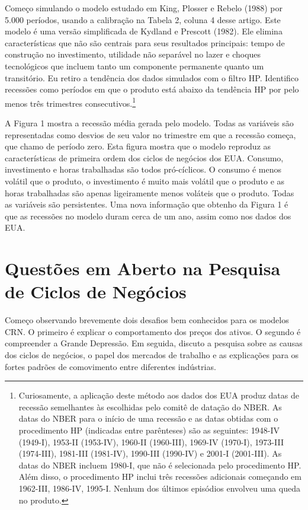 \documentclass[12pt]{article}
\begin{document}
Começo simulando o modelo estudado em King, Plosser e Rebelo (1988) por 5.000 períodos, usando a calibração na Tabela 2, coluna 4 desse artigo. Este modelo é uma versão simplificada de Kydland e Prescott (1982). Ele elimina características que não são centrais para seus resultados principais: tempo de construção no investimento, utilidade não separável no lazer e choques tecnológicos que incluem tanto um componente permanente quanto um transitório. Eu retiro a tendência dos dados simulados com o filtro HP. Identifico recessões como períodos em que o produto está abaixo da tendência HP por pelo menos três trimestres consecutivos.\footnote{Curiosamente, a aplicação deste método aos dados dos EUA produz datas de recessão semelhantes às escolhidas pelo comitê de datação do NBER. As datas do NBER para o início de uma recessão e as datas obtidas com o procedimento HP (indicadas entre parênteses) são as seguintes: 1948-IV (1949-I), 1953-II (1953-IV), 1960-II (1960-III), 1969-IV (1970-I), 1973-III (1974-III), 1981-III (1981-IV), 1990-III (1990-IV) e 2001-I (2001-III). As datas do NBER incluem 1980-I, que não é selecionada pelo procedimento HP. Além disso, o procedimento HP inclui três recessões adicionais começando em 1962-III, 1986-IV, 1995-I. Nenhum dos últimos episódios envolveu uma queda no produto.}

A Figura 1 mostra a recessão média gerada pelo modelo. Todas as variáveis são representadas como desvios de seu valor no trimestre em que a recessão começa, que chamo de período zero. Esta figura mostra que o modelo reproduz as características de primeira ordem dos ciclos de negócios dos EUA. Consumo, investimento e horas trabalhadas são todos pró-cíclicos. O consumo é menos volátil que o produto, o investimento é muito mais volátil que o produto e as horas trabalhadas são apenas ligeiramente menos voláteis que o produto. Todas as variáveis são persistentes. Uma nova informação que obtenho da Figura 1 é que as recessões no modelo duram cerca de um ano, assim como nos dados dos EUA.

\section{Questões em Aberto na Pesquisa de Ciclos de Negócios}

Começo observando brevemente dois desafios bem conhecidos para os modelos CRN. O primeiro é explicar o comportamento dos preços dos ativos. O segundo é compreender a Grande Depressão. Em seguida, discuto a pesquisa sobre as causas dos ciclos de negócios, o papel dos mercados de trabalho e as explicações para os fortes padrões de comovimento entre diferentes indústrias.
\end{document}
